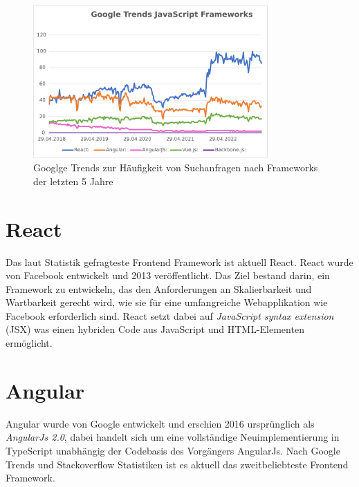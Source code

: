 \begin{figure}[!htb]
    \centering
    \includegraphics[width=0.8\textwidth]{img/Google Stats/google_frameworks_trends}
    \caption{Googlge Trends zur Häufigkeit von Suchanfragen nach Frameworks der letzten 5 Jahre \cite{googleTrends}}
    \label{fig:google_trends}
\end{figure}


\section{React}
Das laut Statistik gefragteste Frontend Framework ist aktuell React.\cite{googleTrends} \cite{stackoverflowStats}
React wurde von Facebook entwickelt und 2013 veröffentlicht.
Das Ziel bestand darin, ein Framework zu entwickeln,
das den Anforderungen an Skalierbarkeit und Wartbarkeit gerecht wird,
wie sie für eine umfangreiche Webapplikation wie Facebook erforderlich sind. \cite[S. 1]{gackenheimer2015introduction}
React setzt dabei auf \emph{JavaScript syntax extension} (JSX) was einen hybriden Code aus JavaScript und HTML-Elementen ermöglicht. \cite{react}

\section{Angular}
Angular wurde von Google entwickelt und erschien 2016 ursprünglich als \emph{AngularJs 2.0},
dabei handelt sich um eine vollständige Neuimplementierung in TypeScript unabhängig der Codebasis des Vorgängers AngularJs. \cite[S. 209-210]{bin2019}
Nach Google Trends und Stackoverflow Statistiken ist es aktuell das zweitbeliebteste
Frontend Framework. \cite{googleTrends} \cite{stackoverflowStats}
